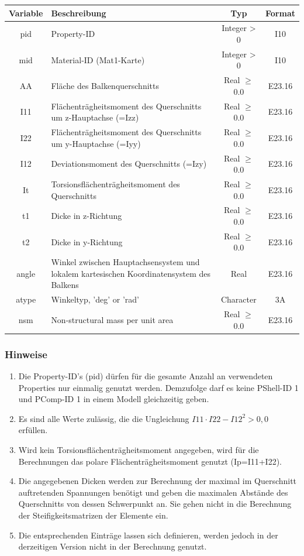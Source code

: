 \documentclass[11pt,titlepage,listof=totoc,bibliography=totoc,twoside]{scrreprt}
\begin{document}
{{\begin{tabularx}{\textwidth}{cXcc}
\toprule
Variable& Beschreibung											& Typ			& Format\\
\midrule
pid	& Property-ID											& Integer > 0		& I10	\\
mid	& Material-ID (Mat1-Karte)									& Integer > 0		& I10	\\
AA	& Fläche des Balkenquerschnitts									& Real $\ge$ 0.0	& E23.16\\
I11	& Flächenträgheitsmoment des Querschnitts um z-Hauptachse (=Izz)				& Real $\ge$ 0.0	& E23.16\\
I22	& Flächenträgheitsmoment des Querschnitts um y-Hauptachse (=Iyy)				& Real $\ge$ 0.0	& E23.16\\
I12	& Deviationsmoment des Querschnitts (=Izy)							& Real $\ge$ 0.0	& E23.16\\
It	& Torsionsflächenträgheitsmoment des Querschnitts						& Real $\ge$ 0.0	& E23.16\\
t1	& Dicke in z-Richtung										& Real $\ge$ 0.0	& E23.16\\
t2	& Dicke in y-Richtung										& Real $\ge$ 0.0	& E23.16\\
angle	& Winkel zwischen Hauptachsensystem und lokalem kartesischen Koordinatensystem des Balkens	& Real			& E23.16\\
atype	& Winkeltyp, 'deg' or 'rad'									& Character		& 3A	\\
nsm	& Non-structural mass per unit area								& Real $\ge$ 0.0	& E23.16\\
\bottomrule
\end{tabularx}

\subsubsection{Hinweise}

\begin{enumerate}
\item Die Property-ID's (pid) dürfen für die gesamte Anzahl an verwendeten Properties nur einmalig genutzt werden. Demzufolge darf es keine PShell-ID 1 und PComp-ID 1 in einem Modell gleichzeitig geben.
\item Es sind alle Werte zulässig, die die Ungleichung $I11\cdot I22-I12^2>0,0$ erfüllen.
\item Wird kein Torsionsflächenträgheitsmoment angegeben, wird für die Berechnungen das polare Flächenträgheitsmoment genutzt (Ip=I11+I22).
\item Die angegebenen Dicken werden zur Berechnung der maximal im Querschnitt auftretenden Spannungen benötigt und geben die maximalen Abstände des Querschnitts von dessen Schwerpunkt an. Sie gehen nicht in die Berechnung der Steifigkeitsmatrizen der Elemente ein.
\item Die entsprechenden Einträge lassen sich definieren, werden jedoch in der derzeitigen Version nicht in der Berechnung genutzt.
\end{enumerate}

}}
\end{document}
